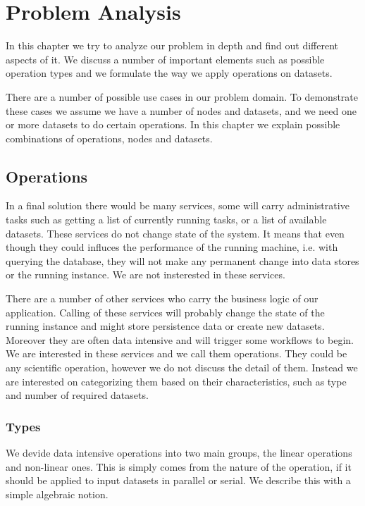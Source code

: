 \chapter{Problem Analysis}
\label{cha:analysis}

In this chapter we try to analyze our problem in depth and find out different aspects of it. We 
discuss a number of important elements such as possible operation types and we formulate the way
we apply operations on datasets.

There are a number of possible use cases in our problem domain. To demonstrate these cases we assume
we have a number of nodes and datasets, and we need one or more datasets to do certain operations.
In this chapter we explain possible combinations of operations, nodes and datasets.

\section{Operations}
In a final solution there would be many services, some will carry administrative tasks such as
getting a list of currently running tasks, or a list of available datasets. These services do not
change state of the system. It means that even though they could influces the performance of the 
running machine, i.e. with querying the database, they will not make any permanent change into 
data stores or the running instance. We are not insterested in these services.

There are a number of other services who carry the business logic of our application. Calling of
these services will probably change the state of the running instance and might store persistence
data or create new datasets. Moreover they are often data intensive and will trigger some workflows
to begin. We are interested in these services and we call them operations. They could be
any scientific operation, however we do not discuss the detail of them. Instead we are interested on
categorizing them based on their characteristics, such as type and number of required datasets.
\subsection{Types}
We devide data intensive operations into two main groups, the linear operations and non-linear ones.
This is simply comes from the nature of the operation, if it should be applied to input datasets
in parallel or serial. We describe this with a simple algebraic notion.


